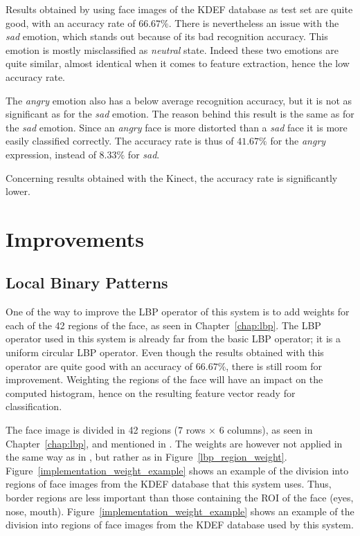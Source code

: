 \noindent Results obtained by using face images of the KDEF database as test set are quite good, with an accuracy rate of $ 66.67\% $. There is nevertheless an issue with the \textit{sad} emotion, which stands out because of its bad recognition accuracy. This emotion is mostly misclassified as \textit{neutral} state. Indeed these two emotions are quite similar, almost identical when it comes to feature extraction, hence the low accuracy rate.
\newline

\noindent The \textit{angry} emotion also has a below average recognition accuracy, but it is not as significant as for the \textit{sad} emotion. The reason behind this result is the same as for the \textit{sad} emotion. Since an \textit{angry} face is more distorted than a \textit{sad} face it is more easily classified correctly. The accuracy rate is thus of $ 41.67\% $ for the \textit{angry} expression,  instead of $ 8.33\% $ for \textit{sad}.
\newline

\noindent Concerning results obtained with the Kinect, the accuracy rate is significantly lower.
\newline

\section{Improvements}

\subsection{Local Binary Patterns}

\vspace{\baselineskip}
\noindent One of the way to improve the LBP operator of this system is to add weights for each of the 42 regions of the face, as seen in Chapter~\ref{chap:lbp}. The LBP operator used in this system is already far from the basic LBP operator; it is a uniform circular LBP operator. Even though the results obtained with this operator are quite good with an accuracy of $ 66.67\% $, there is still room for improvement. Weighting the regions of the face will have an impact on the computed histogram, hence on the resulting feature vector ready for classification. \newline

\noindent The face image is divided in 42 regions ($ 7 $ rows $\times$ $ 6 $ columns), as seen in Chapter~\ref{chap:lbp}, and mentioned in \cite{GAN08}. The weights are however not applied in the same way as in \cite{GAN08}, but rather as in Figure~\ref{lbp_region_weight}. Figure~\ref{implementation_weight_example} shows an example of the division into regions of face images from the KDEF database that this system uses. Thus, border regions are less important than those containing the ROI of the face (eyes, nose, mouth). Figure~\ref{implementation_weight_example} shows an example of the division into regions of face images from the KDEF database used by this system.
\newline

